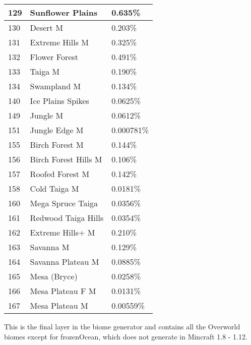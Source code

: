 \documentclass{article}
\begin{document}
	\begin{tabular}{|l|l|l|}\hline
		129    & Sunflower Plains     & 0.635\%\\\hline
		130    & Desert M             & 0.203\%\\\hline
		131    & Extreme Hills M      & 0.325\%\\\hline
		132    & Flower Forest        & 0.491\%\\\hline
		133    & Taiga M              & 0.190\%\\\hline
		134    & Swampland M          & 0.134\%\\\hline
		140    & Ice Plains Spikes    & 0.0625\%\\\hline
		149    & Jungle M             & 0.0612\%\\\hline
		151    & Jungle Edge M        & 0.000781\%\\\hline
		155    & Birch Forest M       & 0.144\%\\\hline
		156    & Birch Forest Hills M & 0.106\%\\\hline
		157    & Roofed Forest M      & 0.142\%\\\hline
		158    & Cold Taiga M         & 0.0181\%\\\hline
		160    & Mega Spruce Taiga    & 0.0356\%\\\hline
		161    & Redwood Taiga Hills  & 0.0354\%\\\hline
		162    & Extreme Hills+ M     & 0.210\%\\\hline
		163    & Savanna M            & 0.129\%\\\hline
		164    & Savanna Plateau M    & 0.0885\%\\\hline
		165    & Mesa (Bryce)         & 0.0258\%\\\hline
		166    & Mesa Plateau F M     & 0.0131\%\\\hline
		167    & Mesa Plateau M       & 0.00559\%\\\hline
	\end{tabular}
	
	\medskip\noindent
	This is the final layer in the biome generator and contains all the Overworld biomes except for frozenOcean, which does not generate in Mincraft 1.8 - 1.12.
	
\end{document}
